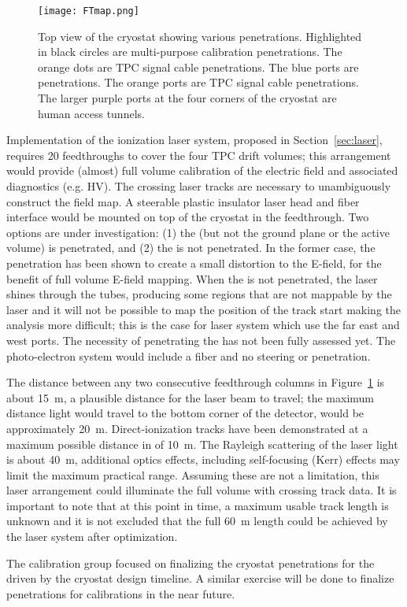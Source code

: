 
\begin{figure}[tbp]
\centering
\texttt{[image: FTmap.png]}
\caption{Top view of the \spmod %
cryostat showing various penetrations. Highlighted in black circles are multi-purpose calibration penetrations. The orange dots are TPC signal cable penetrations. The blue ports are 
penetrations. The orange ports are TPC signal cable penetrations. The larger purple ports at the four corners of the cryostat are human access tunnels.}
\label{fig:ftmap}
\end{figure}

Implementation of the ionization laser system, proposed in Section~\ref{sec:laser}, requires 20 feedthroughs to cover the four TPC drift volumes; this arrangement would provide (almost) full volume calibration of the electric field and associated diagnostics (e.g. HV). The crossing laser tracks are necessary to unambiguously construct the field map. A steerable plastic insulator laser head and fiber interface would be mounted on top of the cryostat in the feedthrough. Two options are under investigation: (1) the  (but not the ground plane or the active volume) is penetrated, and (2) the  is not penetrated. In the former case, the  penetration has been shown to create a small distortion to the E-field, for the benefit of full volume E-field mapping. When the  is not penetrated, the laser shines through the  tubes, producing some regions that are not mappable by the laser and it will not be possible to map the position of the track start making the analysis more difficult; this is the case for laser system which use the far east and west ports. The necessity of penetrating the  has not been fully assessed yet. The photo-electron system would include a fiber and no steering or penetration.

The distance between any two consecutive feedthrough columns in Figure~\ref{fig:ftmap} is about \SI{15}{\m}, a plausible distance for the laser beam to travel; the maximum distance light would travel to the bottom corner of the detector, would be approximately \SI{20}{\m}.  Direct-ionization tracks have been demonstrated at a maximum possible distance in \microboone of \SI{10}{\m}. The Rayleigh scattering of the laser light is about \SI{40}{\m}, additional optics effects, including self-focusing (Kerr) effects may limit the maximum practical range. Assuming these are not a limitation, this laser arrangement could illuminate the full volume with crossing track data. It is important to note that at this point in time, a maximum usable track length is unknown and it is not excluded that the full \SI{60}{\m} \detmodule length could be achieved by the laser system after optimization.

The calibration group focused on finalizing the cryostat penetrations for the \spmod driven by the cryostat design timeline. A similar exercise will be done to finalize \dpmod penetrations for calibrations in the near future.


